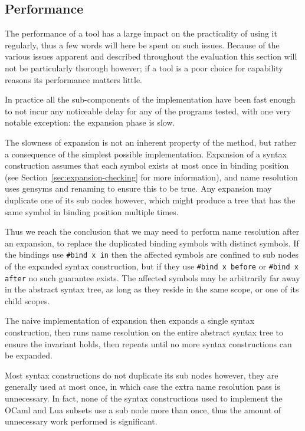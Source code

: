 \documentclass{kththesis}
\begin{document}
\subsection{Performance} \label{sec:performance}

The performance of a tool has a large impact on the practicality of using it regularly, thus a few words will here be spent on such issues. Because of the various issues apparent and described throughout the evaluation this section will not be particularly thorough however; if a tool is a poor choice for capability reasons its performance matters little.

In practice all the sub-components of the implementation have been fast enough to not incur any noticeable delay for any of the programs tested, with one very notable exception: the expansion phase is slow.

The slowness of expansion is not an inherent property of the method, but rather a consequence of the simplest possible implementation. Expansion of a syntax construction assumes that each symbol exists at most once in binding position (see Section~\ref{sec:expansion-checking} for more information), and name resolution uses gensyms and renaming to ensure this to be true. Any expansion may duplicate one of its sub nodes however, which might produce a tree that has the same symbol in binding position multiple times.

Thus we reach the conclusion that we may need to perform name resolution after an expansion, to replace the duplicated binding symbols with distinct symbols. If the bindings use \texttt{#bind x in} then the affected symbols are confined to sub nodes of the expanded syntax construction, but if they use \texttt{#bind x before} or \texttt{#bind x after} no such guarantee exists. The affected symbols may be arbitrarily far away in the abstract syntax tree, as long as they reside in the same scope, or one of its child scopes.

The naive implementation of expansion then expands a single syntax construction, then runs name resolution on the entire abstract syntax tree to ensure the invariant holds, then repeats until no more syntax constructions can be expanded.

Most syntax constructions do not duplicate its sub nodes however, they are generally used at most once, in which case the extra name resolution pass is unnecessary. In fact, none of the syntax constructions used to implement the OCaml and Lua subsets use a sub node more than once, thus the amount of unnecessary work performed is significant.
\end{document}
